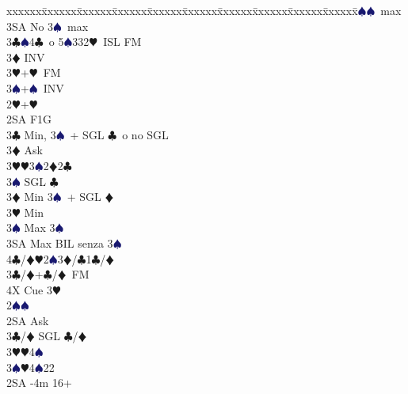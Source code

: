 \documentclass[a4paper,italian]{article}
\newcommand{\BC}{\textcolor{OliveGreen}{$\clubsuit$}}
\newcommand{\BD}{\textcolor{RedOrange}{$\vardiamondsuit$}}
\newcommand{\BH}{\textcolor{Red2}{$\varheartsuit${}}}
\newcommand{\BS}{\textcolor{MidnightBlue}{$\spadesuit${}}}
\newenvironment{bidtable}
{\begin{tabbing}

    xxxxxx\=xxxxxx\=xxxxxx\=xxxxxx\=xxxxxx\=xxxxxx\=xxxxxx\=xxxxxx\=xxxxxx\=xxxxxx\=\kill}
{\end{tabbing} }%
\begin{document}
\begin{multicols*}{2}
\begin{bidtable}
                                            3\BS {}\BS\ max\\
                                            3SA \> No 3\BS\ max\-\\
                                            3\BC {}\BS 4\BC\ o 5\BS 332\BH\ ISL FM\\
                                            3\BD \> INV\\
                                            3\BH {}+\BH\ FM\\
                                            3\BS {}+\BS\ INV\-\\
                                            2\BH {}+\BH \+\\
                                            2SA \> F1G\+\\
                                            3\BC \> Min, 3\BS\ + SGL \BC\ o no SGL \+\\
                                            3\BD \> Ask\+\\
                                            3\BH {}\BH3\BS2\BD2\BC\\
                                            3\BS \> SGL \BC\-\-\\
                                            3\BD \> Min 3\BS\ + SGL \BD \\
                                            3\BH \> Min\\
                                            3\BS \> Max 3\BS \\
                                            3SA \> Max BIL senza 3\BS\\
                                            4\BC/\BD {}\BH2\BS3\BD/\BC1\BC/\BD\-\\
                                            3\BC/\BD {}+\BC /\BD\ FM\\
                                            4X \> Cue 3\BH \-\\
                                            2\BS {}\BS \+\\
                                            2SA \> Ask\+\\
                                            3\BC/\BD \> SGL \BC /\BD \\
                                            3\BH {}\BH 4\BS \\
                                            3\BS {}\BH 4\BS 22\-\-\\
                                            2SA -4m 16+\+\\

\end{bidtable}
\end{multicols*}
\end{document}

